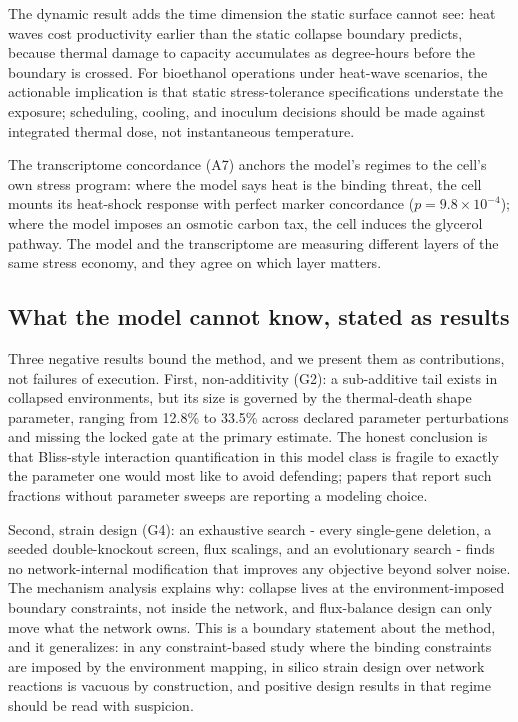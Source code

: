 \documentclass[12pt]{article}
\begin{document}
The dynamic result adds the time dimension the static surface cannot
see: heat waves cost productivity earlier than the static collapse
boundary predicts, because thermal damage to capacity accumulates as
degree-hours before the boundary is crossed. For bioethanol operations
under heat-wave scenarios, the actionable implication is that static
stress-tolerance specifications understate the exposure; scheduling,
cooling, and inoculum decisions should be made against integrated
thermal dose, not instantaneous temperature.

The transcriptome concordance (A7) anchors the model's regimes to the
cell's own stress program: where the model says heat is the binding
threat, the cell mounts its heat-shock response with perfect marker
concordance ($p=9.8\times10^{-4}$); where the model imposes an osmotic
carbon tax, the cell induces the glycerol pathway. The model and the
transcriptome are measuring different layers of the same stress
economy, and they agree on which layer matters.

\subsection{What the model cannot know, stated as results}

Three negative results bound the method, and we present them as
contributions, not failures of execution. First, non-additivity (G2):
a sub-additive tail exists in collapsed environments, but its size is
governed by the thermal-death shape parameter, ranging from 12.8\% to
33.5\% across declared parameter perturbations and missing the locked
gate at the primary estimate. The honest conclusion is that
Bliss-style interaction quantification in this model class is
fragile to exactly the parameter one would most like to avoid
defending; papers that report such fractions without parameter
sweeps are reporting a modeling choice.

Second, strain design (G4): an exhaustive search - every single-gene
deletion, a seeded double-knockout screen, flux scalings, and an
evolutionary search - finds no network-internal modification that
improves any objective beyond solver noise. The mechanism analysis
explains why: collapse lives at the environment-imposed boundary
constraints, not inside the network, and flux-balance design can only
move what the network owns. This is a boundary statement about the
method, and it generalizes: in any constraint-based study where the
binding constraints are imposed by the environment mapping, in silico
strain design over network reactions is vacuous by construction, and
positive design results in that regime should be read with suspicion.
\end{document}
